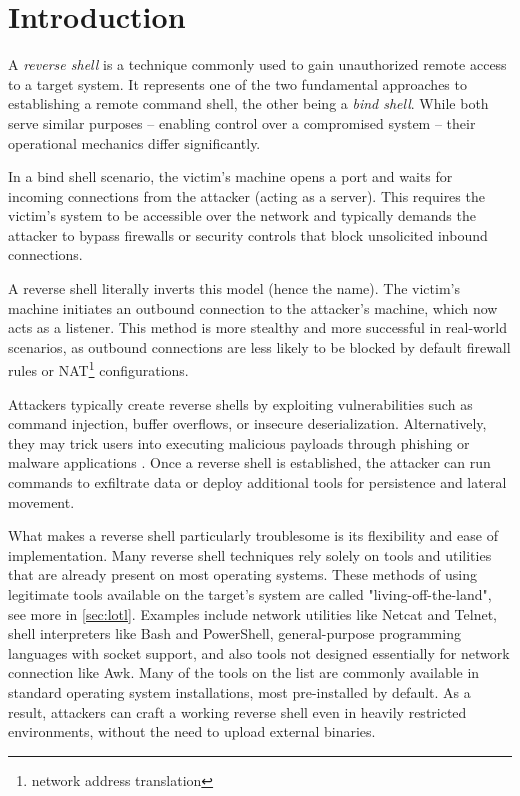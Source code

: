 \chapter*{Introduction}

A \textit{reverse shell} is a technique commonly used to gain unauthorized remote access to a target system. It represents one of the two fundamental approaches to establishing a remote command shell, the other being a \textit{bind shell}. While both serve similar purposes -- enabling control over a compromised system -- their operational mechanics differ significantly.

In a bind shell scenario, the victim's machine opens a port and waits for incoming connections from the attacker (acting as a server). This requires the victim's system to be accessible over the network and typically demands the attacker to bypass firewalls or security controls that block unsolicited inbound connections.

A reverse shell literally inverts this model (hence the name). The victim's machine initiates an outbound connection to the attacker's machine, which now acts as a listener. This method is more stealthy and more successful in real-world scenarios, as outbound connections are less likely to be blocked by default firewall rules or NAT\footnote{network address translation} configurations.

Attackers typically create reverse shells by exploiting vulnerabilities such as command injection, buffer overflows, or insecure deserialization. Alternatively, they may trick users into executing malicious payloads through phishing or malware applications \cite{imperva}. Once a reverse shell is established, the attacker can run commands to exfiltrate data or deploy additional tools for persistence and lateral movement.

What makes a reverse shell particularly troublesome is its flexibility and ease of implementation. Many reverse shell techniques rely solely on tools and utilities that are already present on most operating systems. These methods of using legitimate tools available on the target's system are called "living-off-the-land", see more in \cref{sec:lotl}. Examples include network utilities like Netcat and Telnet, shell interpreters like Bash and PowerShell, general-purpose programming languages with socket support, and also tools not designed essentially for network connection like Awk. Many of the tools on the list are commonly available in standard operating system installations, most pre-installed by default. As a result, attackers can craft a working reverse shell even in heavily restricted environments, without the need to upload external binaries.

